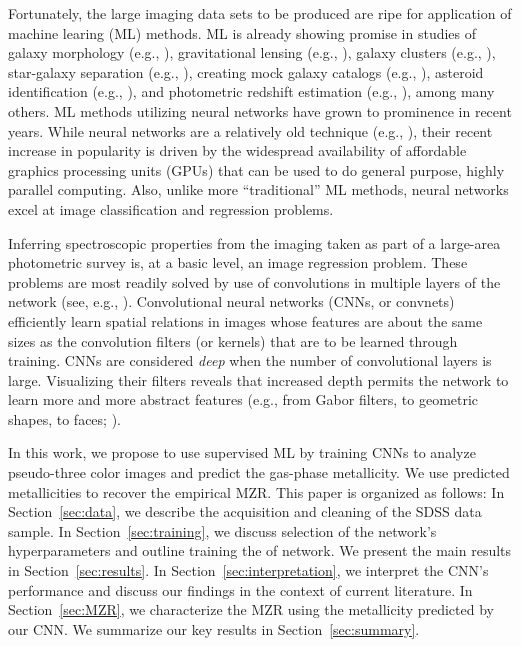 \documentclass[fleqn,usenatbib]{mnras}
\newcommand{\eg}{e.g.}
\newcommand{\citeeg}[1]{(\eg, \citealt{#1})}
\begin{document}
Fortunately, the large imaging data sets to be produced are ripe for application of machine learing (ML) methods. ML is already showing promise in studies of galaxy morphology \citeeg{Dieleman2015, Huertas-Company2015, Beck2018, Dai2018, Hocking2018}, gravitational lensing \citeeg{Hezaveh2017, Lanusse2017, Petrillo2017, Petrillo2018}, galaxy clusters \citeeg{Ntampaka2015, Ntampaka2016}, star-galaxy separation \citeeg{Kim2017}, creating mock galaxy catalogs \citeeg{Xu2013}, asteroid identification \citeeg{Smirnov2017}, and photometric redshift estimation \citeeg{Hoyle2016, DIsanto2018, Pasquet2019}, among many others. ML methods utilizing neural networks have grown to prominence in recent years. While neural networks are a relatively old technique \citeeg{LeCun1989}, their recent increase in popularity is driven by the widespread availability of affordable graphics processing units (GPUs) that can be used to do general purpose, highly parallel computing. Also, unlike more ``traditional'' ML methods, neural networks excel at image classification and regression problems.

Inferring spectroscopic properties from the imaging taken as part of a large-area photometric survey is, at a basic level, an image regression problem. These problems are most readily solved by use of convolutions in multiple layers of the network (see, \eg, \citealt{Krizhevsky2012}). Convolutional neural networks (CNNs, or convnets) efficiently learn spatial relations in images whose features are about the same sizes as the convolution filters (or kernels) that are to be learned through training. CNNs are considered \textit{deep} when the number of convolutional layers is large. Visualizing their filters reveals that increased depth permits the network to learn more and more abstract features (\eg, from Gabor filters, to geometric shapes, to faces; \citealt{Zeiler2014}).

In this work, we propose to use supervised ML by training CNNs to analyze pseudo-three color images and predict the gas-phase metallicity. We use predicted metallicities to recover the empirical \cite{Tremonti2004} MZR. This paper is organized as follows: In Section~\ref{sec:data}, we describe the acquisition and cleaning of the SDSS data sample. In Section~\ref{sec:training}, we discuss selection of the network's hyperparameters and outline training the of network. We present the main results in Section~\ref{sec:results}. In Section~\ref{sec:interpretation}, we interpret the CNN's performance and discuss our findings in the context of current literature. In Section~\ref{sec:MZR}, we characterize the MZR using the metallicity predicted by our CNN. We summarize our key results in Section~\ref{sec:summary}.
\end{document}
